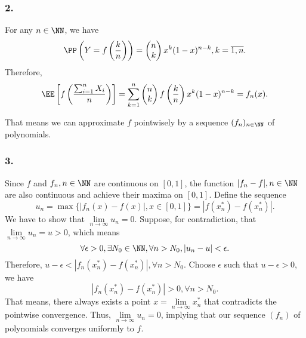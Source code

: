\subsubsection*{2.} For any $n\in\NN$, we have $$\PP\left(Y=f\left(\dfrac{k}{n}\right)\right) = \begin{pmatrix}
    n\\k
\end{pmatrix}x^k(1-x)^{n-k}, k=\overline{1,n}.$$ Therefore,
$$\EE\left[f\left(\dfrac{\sum_{i=1}^nX_i}{n}\right)\right] = \sum\limits_{k=1}^n \begin{pmatrix}
    n\\k
\end{pmatrix}f\left(\dfrac{k}{n}\right)x^k(1-x)^{n-k} = f_n(x).$$

That means we can approximate $f$ pointwisely by a sequence $(f_n)_{n\in\NN}$ of polynomials.

\subsubsection*{3.} Since $f$ and $f_n, n\in\NN$ are continuous on $[0,1]$, the function $|f_n-f|, n\in\NN$ are also continuous and achieve their maxima on $[0,1]$. Define the sequence $$u_n = \max\{|f_n(x)-f(x)|, x\in[0,1]\} = |f(x_n^*)-f(x_n^*)|.$$ 
We have to show that $\lim\limits_{n\to\infty} u_n = 0$. Suppose, for contradiction, that $\lim\limits_{n\to\infty} u_n = u >0$, which means
$$\forall \epsilon>0, \exists N_0\in\NN, \forall n > N_0, |u_n - u| < \epsilon.$$
Therefore, $u-\epsilon < |f_n(x_n^*)-f(x_n^*)|, \forall n > N_0$.
Choose $\epsilon$ such that $u-\epsilon>0$, we have $$|f_n(x_n^*)-f(x_n^*)| > 0, \forall n > N_0.$$
That means, there always exists a point $x=\lim\limits_{n\to\infty}x_n^*$ that contradicts the pointwise convergence. Thus, $\lim\limits_{n\to\infty} u_n = 0$, implying that our sequence $(f_n)$ of polynomials converges uniformly to $f$.

